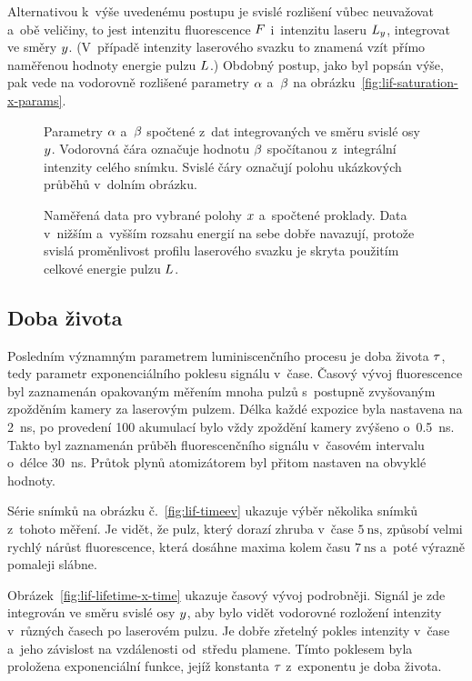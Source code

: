 Alternativou k~výše uvedenému postupu je svislé rozlišení vůbec neuvažovat
a~obě veličiny, to jest intenzitu fluorescence $F$ i~intenzitu
laseru $L_y$, integrovat ve směry $y$.
(V~případě intenzity laserového svazku to znamená vzít přímo
naměřenou hodnoty energie pulzu $L$.)
Obdobný postup, jako byl popsán výše, pak vede na vodorovně rozlišené
parametry $\alpha$ a~$\beta$ na obrázku~\ref{fig:lif-saturation-x-params}.

\begin{figure}[htp]
	\centering
	\small
	
	\caption{Parametry $\alpha$ a~$\beta$ spočtené z~dat integrovaných
		ve směru svislé osy $y$.
		Vodorovná čára označuje hodnotu $\beta$ spočítanou z~integrální
		intenzity celého snímku.
		Svislé čáry označují polohu ukázkových průběhů v~dolním obrázku.}
	\label{fig:lif-saturation-x-params}
	\bigskip
	
	\caption{Naměřená data pro vybrané polohy $x$ a~spočtené proklady.
		Data v~nižším a~vyšším rozsahu energií na sebe dobře navazují,
		protože svislá proměnlivost profilu laserového svazku je skryta
		použitím celkové energie pulzu $L$.}
	\label{fig:lif-saturation-x-fits}
\end{figure}

\clearpage
\subsection{Doba života}
\label{sec:lif-lifetime}
Posledním významným parametrem luminiscenčního procesu
je doba života $\tau$,
tedy parametr exponenciálního poklesu signálu v~čase.
Časový vývoj fluorescence byl zaznamenán opakovaným měřením mnoha pulzů
s~postupně zvyšovaným zpožděním kamery za laserovým pulzem.
Délka každé expozice byla nastavena na \SI{2}{\nano\second},
po provedení 100 akumulací bylo vždy zpoždění kamery zvýšeno
o~\SI{0.5}{\nano\second}.
Takto byl zaznamenán průběh fluorescenčního signálu v~časovém intervalu
o~délce \SI{30}{\nano\second}.
Průtok plynů atomizátorem byl přitom nastaven na obvyklé hodnoty.

Série snímků na obrázku č.~\ref{fig:lif-timeev} ukazuje výběr několika
snímků z~tohoto měření.
Je vidět, že pulz, který dorazí zhruba v~čase $\SI{5}{\nano\second}$,
způsobí velmi rychlý nárůst fluorescence, která dosáhne maxima kolem
času $\SI{7}{\nano\second}$ a~poté výrazně pomaleji slábne.

Obrázek~\ref{fig:lif-lifetime-x-time} ukazuje časový vývoj podrobněji.
Signál je zde integrován ve směru svislé osy $y$, aby bylo vidět
vodorovné rozložení intenzity v~různých časech po laserovém pulzu.
Je dobře zřetelný pokles intenzity v~čase a~jeho závislost
na vzdálenosti od~středu plamene.
Tímto poklesem byla proložena exponenciální funkce,
jejíž konstanta $\tau$ z~exponentu je doba života.

